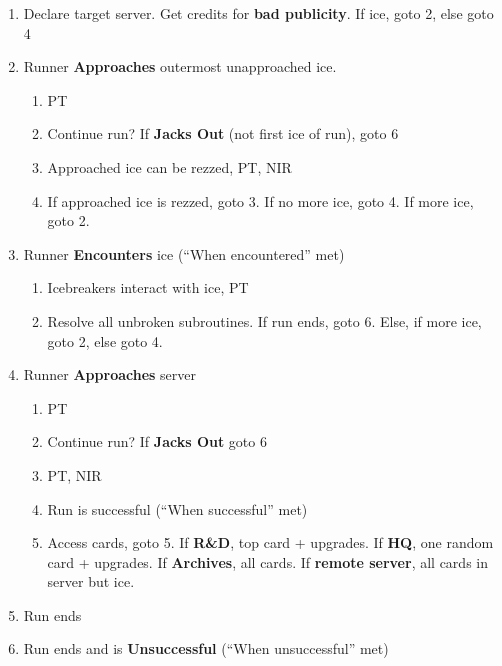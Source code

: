 \documentclass[12pt]{article}
\newenvironment{enumerateCustom}
{\begin{enumerate}
  \setlength{\itemsep}{1pt}
  \setlength{\parskip}{0pt}
  \setlength{\parsep}{0pt}}
{\end{enumerate}}
\begin{document}
\begin{multicols*}{2}
\begin{enumerateCustom}
	\item Declare target server. Get credits for \textbf{bad publicity}. If ice, goto 2, else goto 4
	\item Runner \textbf{Approaches} outermost unapproached ice.
		\begin{enumerateCustom}
			\item PT
			\item Continue run? If \textbf{Jacks Out} (not first ice of run), goto 6
			\item Approached ice can be rezzed, PT, NIR
			\item If approached ice is rezzed, goto 3. If no more ice, goto 4. If more ice, goto 2.
		\end{enumerateCustom}
	\item Runner \textbf{Encounters} ice (``When encountered'' met)
		\begin{enumerateCustom}
			\item Icebreakers interact with ice, PT
			\item Resolve all unbroken subroutines. If run ends, goto 6. Else, if more ice, goto 2, else goto 4.
		\end{enumerateCustom}
	\item Runner \textbf{Approaches} server
		\begin{enumerateCustom}
			\item PT
			\item Continue run? If \textbf{Jacks Out} goto 6
			\item PT, NIR
			\item Run is successful (``When successful'' met)
			\item Access cards, goto 5. If \textbf{R\&D}, top card + upgrades. If \textbf{HQ}, one random card + upgrades. If \textbf{Archives}, all cards. If \textbf{remote server}, all cards in server but ice.
		\end{enumerateCustom}
	\item Run ends
	\item Run ends and is \textbf{Unsuccessful} (``When unsuccessful'' met)
\end{enumerateCustom}


\end{multicols*}
\end{document}
